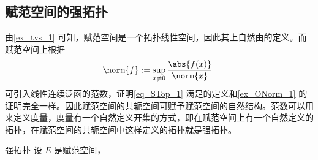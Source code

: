 
\subsection{赋范空间的强拓扑}

由\autoref{ex_tvs_1} 可知，赋范空间是一个拓扑线性空间，因此其上自然由的定义。而赋范空间上根据
\begin{equation}\label{eq_STop_1}
\norm{f}:=\sup_{x\neq0}\frac{\abs{f(x)}}{\norm{x}}~
\end{equation}
可引入线性连续泛函的范数，证明\autoref{eq_STop_1} 满足的定义和\autoref{ex_ONorm_1} 的证明完全一样。因此赋范空间的共轭空间可赋予赋范空间的自然结构。范数可以用来定义度量，度量有一个自然定义开集的方式，即在赋范空间上有一个自然定义的拓扑，在赋范空间的共轭空间中这样定义的拓扑就是强拓扑。
\begin{definition}{强拓扑}
设 $E$ 是赋范空间，
\end{definition}


